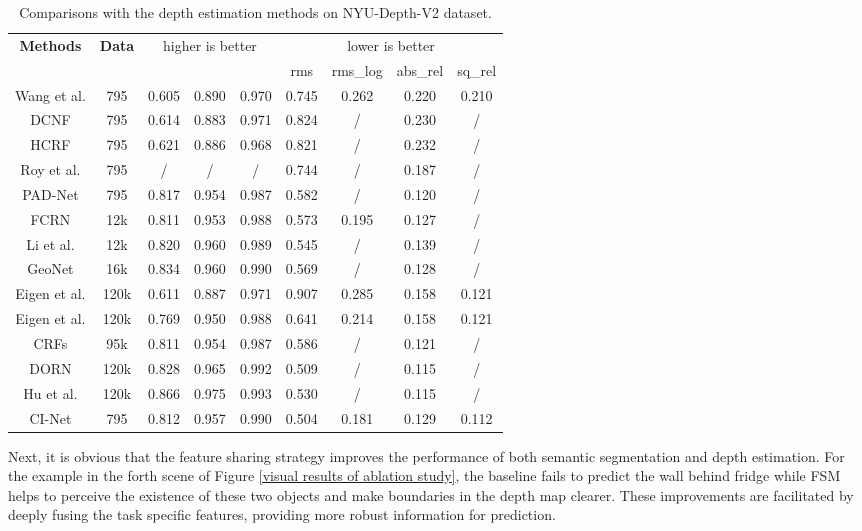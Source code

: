 \documentclass[sn-mathphys]{sn-jnl}
\theoremstyle{thmstyleone}\newtheorem{theorem}{Theorem}\newtheorem{proposition}[theorem]{Proposition}
\theoremstyle{thmstyletwo}\newtheorem{example}{Example}\newtheorem{remark}{Remark}
\theoremstyle{thmstylethree}\newtheorem{definition}{Definition}\usepackage[numbers,sort&compress]{natbib}
\begin{document}
\renewcommand\arraystretch{1.3}
\begin{table}[htbp]
	\centering
	\caption{Comparisons with the depth estimation methods on NYU-Depth-V2 dataset.}
	\begin{tabular}{c|c|ccc|cccc}
		\toprule
		\multirow{2}{*}{\textbf{Methods}}  & \multirow{2}{*}{\textbf{Data}} & \multicolumn{3}{c|}{higher is better} & \multicolumn{4}{c}{lower is better} \\ \cline{3-9} 
		&&  &  &  & rms & rms\_log & abs\_rel & sq\_rel \\
		\hline
		\hline
		Wang et al.\cite{Peng_Wang_2015}  & 795  & 0.605 & 0.890 & 0.970 & 0.745 & 0.262 & 0.220 & 0.210\\
		DCNF\cite{Liu_2015} & 795  & 0.614 & 0.883 & 0.971 & 0.824 & / & 0.230 & / \\
		HCRF\cite{Bo_Li_2015}  & 795  &  0.621 & 0.886 & 0.968 & 0.821 & / & 0.232 & / \\ 
		Roy et al.\cite{Roy_2016} & 795  & / & /& /  & 0.744 & / & 0.187 & / \\
		PAD-Net \cite{Xu_2018_Pad}  & 795 & 0.817 & 0.954 & 0.987 & 0.582 & / & 0.120 & / \\
		\hline
		FCRN \cite{Laina_2016}  & 12k & 0.811 & 0.953 & 0.988 & 0.573 & 0.195 & 0.127 & / \\
		Li et al. \cite{Li_2018} & 12k & 0.820 & 0.960 & 0.989 & 0.545 & / & 0.139 & / \\
		GeoNet \cite{Qi_2018}  & 16k & 0.834 & 0.960 & 0.990 & 0.569 & / & 0.128 & / \\
		\hline
		Eigen et al.\cite{eigen2014depth} & 120k & 0.611 & 0.887 & 0.971 & 0.907 & 0.285 & 0.158 & 0.121 \\
		Eigen et al.\cite{Eigen_2015} & 120k & 0.769 & 0.950 & 0.988 & 0.641 & 0.214 & 0.158 & 0.121 \\
		CRFs\cite{Xu_2018} & 95k  & 0.811 & 0.954 & 0.987 & 0.586 & / & 0.121 & / \\
		DORN \cite{Fu_2018} & 120k & 0.828 & 0.965 & 0.992 & 0.509 & / & 0.115 & / \\
		Hu et al. \cite{Hu_2019}  & 120k  & 0.866 & 0.975 & 0.993 & 0.530 & / & 0.115 & / \\
		\hline
		\hline
		CI-Net & 795 & 0.812 & 0.957 & 0.990 & 0.504 & 0.181 & 0.129 & 0.112 \\
		\bottomrule
	\end{tabular}
	\label{comparison of depth estimation results on NYU}
\end{table}


Next, it is obvious that the feature sharing strategy improves the performance of both semantic segmentation and depth estimation. For the example in the forth scene of Figure \ref{visual results of ablation study}, the baseline fails to predict the wall behind fridge while FSM helps to perceive the existence of these two objects and make boundaries in the depth map clearer. These improvements are facilitated by deeply fusing the task specific features, providing more robust information for prediction. 
\end{document}
